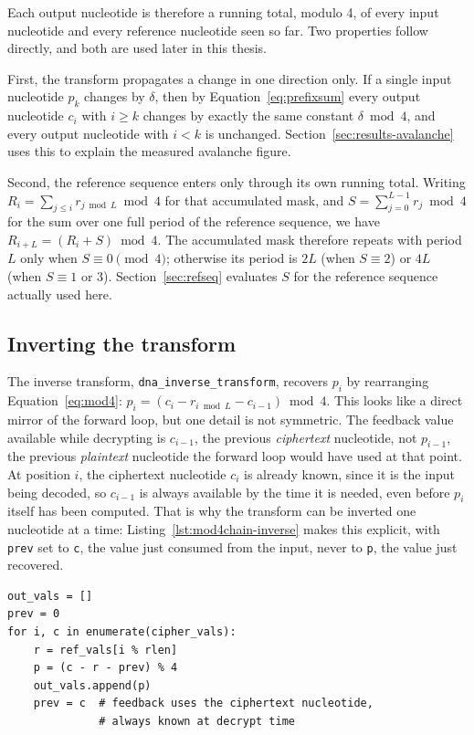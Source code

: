 \documentclass[12pt,a4paper,twoside]{report}
\numberwithin{equation}{chapter}
\begin{document}
Each output nucleotide is therefore a running total, modulo 4, of every
input nucleotide and every reference nucleotide seen so far. Two
properties follow directly, and both are used later in this thesis.

First, the transform propagates a change in one direction only. If a
single input nucleotide $p_k$ changes by $\delta$, then by
Equation~\ref{eq:prefixsum} every output nucleotide $c_i$ with $i \ge k$
changes by exactly the same constant $\delta \bmod 4$, and every output
nucleotide with $i < k$ is unchanged. Section~\ref{sec:results-avalanche}
uses this to explain the measured avalanche figure.

Second, the reference sequence enters only through its own running
total. Writing $R_i = \sum_{j \le i} r_{j \bmod L} \bmod 4$ for that
accumulated mask, and $S = \sum_{j=0}^{L-1} r_j \bmod 4$ for the sum
over one full period of the reference sequence, we have
$R_{i+L} = (R_i + S) \bmod 4$. The accumulated mask therefore repeats
with period $L$ only when $S \equiv 0 \pmod 4$; otherwise its period is
$2L$ (when $S \equiv 2$) or $4L$ (when $S \equiv 1$ or $3$).
Section~\ref{sec:refseq} evaluates $S$ for the reference sequence
actually used here.

\subsection*{Inverting the transform}
The inverse transform, \texttt{dna\_inverse\_transform}, recovers
$p_i$ by rearranging Equation~\ref{eq:mod4}:
$p_i = (c_i - r_{i \bmod L} - c_{i-1}) \bmod 4$. This looks like a
direct mirror of the forward loop, but one detail is not symmetric.
The feedback value available while decrypting is $c_{i-1}$, the
previous \emph{ciphertext} nucleotide, not $p_{i-1}$, the previous
\emph{plaintext} nucleotide the forward loop would have used at that
point. At position $i$, the ciphertext nucleotide $c_i$ is already
known, since it is the input being decoded, so $c_{i-1}$ is always
available by the time it is needed, even before $p_i$ itself has been
computed. That is why the transform can be inverted one nucleotide at
a time: Listing~\ref{lst:mod4chain-inverse} makes this explicit, with
\texttt{prev} set to \texttt{c}, the value just consumed from the
input, never to \texttt{p}, the value just recovered.

\begin{lstlisting}[caption={Chained modulo-4 transform: the inverse
loop, rearranging Equation~\ref{eq:mod4} to recover $p_i$.}, label={lst:mod4chain-inverse}]
out_vals = []
prev = 0
for i, c in enumerate(cipher_vals):
    r = ref_vals[i % rlen]
    p = (c - r - prev) % 4
    out_vals.append(p)
    prev = c  # feedback uses the ciphertext nucleotide,
              # always known at decrypt time
\end{lstlisting}
\end{document}
